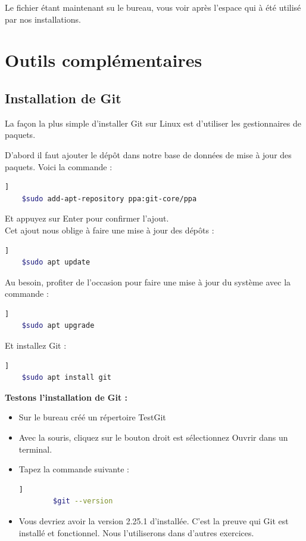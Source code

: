 Le fichier étant maintenant su le bureau, vous voir après l'espace qui à été utilisé par nos installations.
	\section{Outils complémentaires}
	\subsection{Installation de Git}
	La façon la plus simple d'installer Git sur Linux est d'utiliser les gestionnaires de paquets. 
	
	D'abord il faut ajouter le dépôt dans notre base de données de mise à jour des paquets. Voici la commande :
	\begin{lstlisting}[language=bash]   ]
	$sudo add-apt-repository ppa:git-core/ppa
	\end{lstlisting}
	Et appuyez sur {\color{blue}Enter} pour confirmer l'ajout.\\
	Cet ajout nous oblige à faire une mise à jour des dépôts  : 
	\begin{lstlisting}[language=bash]   ]
	$sudo apt update
	\end{lstlisting}
	
	Au besoin, profiter de l'occasion pour faire une mise à jour du système avec la commande : 
	\begin{lstlisting}[language=bash]   ]
	$sudo apt upgrade
	\end{lstlisting}
	
	Et installez Git : 
	\begin{lstlisting}[language=bash]   ]
	$sudo apt install git
	\end{lstlisting}
	
	\textbf{Testons l'installation de Git : }\\
	\begin{itemize}
		\item Sur le bureau créé un répertoire {\color{blue}TestGit}
		\item Avec la souris, cliquez sur le bouton droit est sélectionnez {\color{blue}Ouvrir dans un terminal}.
		\item Tapez la commande suivante :
		\begin{lstlisting}[language=bash]   ]
		$git --version
		\end{lstlisting}
		\item Vous devriez avoir la version 2.25.1 d'installée. C'est la preuve qui Git est installé et fonctionnel. Nous l'utiliserons dans d'autres exercices.
	\end{itemize}
	

